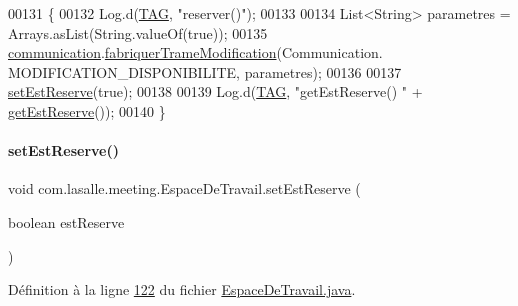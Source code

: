 \begin{DoxyCode}
00131     \{
00132         Log.d(\hyperlink{classcom_1_1lasalle_1_1meeting_1_1_espace_de_travail_a30a7c9d0d084360b166487dbcdf5bad1}{TAG}, \textcolor{stringliteral}{"reserver()"});
00133 
00134         List<String> parametres = Arrays.asList(String.valueOf(\textcolor{keyword}{true}));
00135         \hyperlink{classcom_1_1lasalle_1_1meeting_1_1_espace_de_travail_adbda10d59725486cb1151c050a830114}{communication}.\hyperlink{classcom_1_1lasalle_1_1meeting_1_1_communication_a82b49090e24d8296bfd26a14e0951ade}{fabriquerTrameModification}(Communication.
      MODIFICATION\_DISPONIBILITE, parametres);
00136 
00137         \hyperlink{classcom_1_1lasalle_1_1meeting_1_1_espace_de_travail_ae6609cc6e5c42c0be7936ef3a3748bd0}{setEstReserve}(\textcolor{keyword}{true});
00138 
00139         Log.d(\hyperlink{classcom_1_1lasalle_1_1meeting_1_1_espace_de_travail_a30a7c9d0d084360b166487dbcdf5bad1}{TAG}, \textcolor{stringliteral}{"getEstReserve() "} + \hyperlink{classcom_1_1lasalle_1_1meeting_1_1_espace_de_travail_a69fe30f8d3aff92986f4c39402e16ab0}{getEstReserve}());
00140     \}
\end{DoxyCode}
\mbox{\label{classcom_1_1lasalle_1_1meeting_1_1_espace_de_travail_ae6609cc6e5c42c0be7936ef3a3748bd0}} 
\paragraph{\texorpdfstring{set\+Est\+Reserve()}{setEstReserve()}}
{\footnotesize\ttfamily void com.\+lasalle.\+meeting.\+Espace\+De\+Travail.\+set\+Est\+Reserve (\begin{DoxyParamCaption}\item[{boolean}]{est\+Reserve }\end{DoxyParamCaption})\hspace{0.3cm}{\ttfamily [private]}}



Définition à la ligne \hyperlink{_espace_de_travail_8java_source_l00122}{122} du fichier \hyperlink{_espace_de_travail_8java_source}{Espace\+De\+Travail.\+java}.



